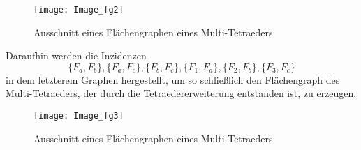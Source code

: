 \documentclass[12pt,titlepage,twoside,cleardoublepage]{article}
\theoremstyle{nummermitklammern}
\numberwithin{equation}{section}
\begin{document}
\begin{figure}[H]
\begin{center}
\texttt{[image: Image\_fg2]}
\end{center}
\caption{Ausschnitt eines Flächengraphen eines Multi-Tetraeders}
\end{figure}
Daraufhin werden die Inzidenzen 
\[
\{F_a,F_b\},\{F_a,F_c\},\{F_b,F_c\},\{F_1,F_a\},\{F_2,F_b\},\{F_3,F_c\}
\] 
in dem letzterem Graphen hergestellt, um so schließlich den Flächengraph des Multi-Tetraeders, der durch die Tetraedererweiterung entstanden ist, zu erzeugen.
\begin{figure}[H]
\begin{center}
\texttt{[image: Image\_fg3]}
\end{center}
\caption{Ausschnitt eines Flächengraphen eines Multi-Tetraeders}
\end{figure}
\end{document}
